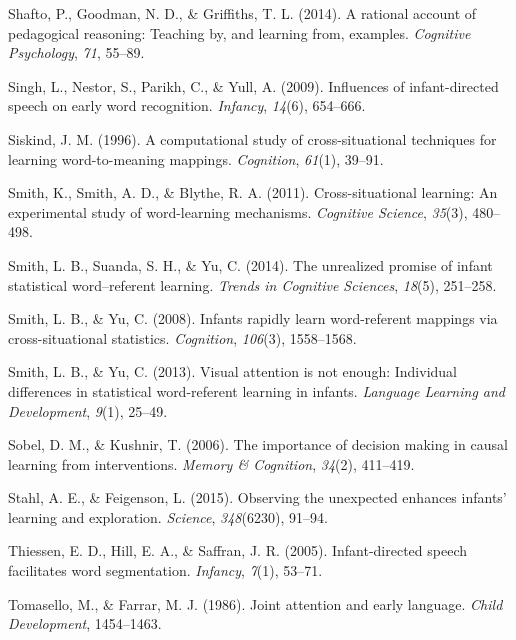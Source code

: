 \documentclass[oneside]{report}
\begin{document}
\leavevmode\hypertarget{ref-shafto2014rational}{}%
Shafto, P., Goodman, N. D., \& Griffiths, T. L. (2014). A rational
account of pedagogical reasoning: Teaching by, and learning from,
examples. \emph{Cognitive Psychology}, \emph{71}, 55--89.

\leavevmode\hypertarget{ref-singh2009influences}{}%
Singh, L., Nestor, S., Parikh, C., \& Yull, A. (2009). Influences of
infant-directed speech on early word recognition. \emph{Infancy},
\emph{14}(6), 654--666.

\leavevmode\hypertarget{ref-siskind1996computational}{}%
Siskind, J. M. (1996). A computational study of cross-situational
techniques for learning word-to-meaning mappings. \emph{Cognition},
\emph{61}(1), 39--91.

\leavevmode\hypertarget{ref-smith2011cross}{}%
Smith, K., Smith, A. D., \& Blythe, R. A. (2011). Cross-situational
learning: An experimental study of word-learning mechanisms.
\emph{Cognitive Science}, \emph{35}(3), 480--498.

\leavevmode\hypertarget{ref-smith2014unrealized}{}%
Smith, L. B., Suanda, S. H., \& Yu, C. (2014). The unrealized promise of
infant statistical word--referent learning. \emph{Trends in Cognitive
Sciences}, \emph{18}(5), 251--258.

\leavevmode\hypertarget{ref-smith2008infants}{}%
Smith, L. B., \& Yu, C. (2008). Infants rapidly learn word-referent
mappings via cross-situational statistics. \emph{Cognition},
\emph{106}(3), 1558--1568.

\leavevmode\hypertarget{ref-smith2013visual}{}%
Smith, L. B., \& Yu, C. (2013). Visual attention is not enough:
Individual differences in statistical word-referent learning in infants.
\emph{Language Learning and Development}, \emph{9}(1), 25--49.

\leavevmode\hypertarget{ref-sobel2006importance}{}%
Sobel, D. M., \& Kushnir, T. (2006). The importance of decision making
in causal learning from interventions. \emph{Memory \& Cognition},
\emph{34}(2), 411--419.

\leavevmode\hypertarget{ref-stahl2015observing}{}%
Stahl, A. E., \& Feigenson, L. (2015). Observing the unexpected enhances
infants' learning and exploration. \emph{Science}, \emph{348}(6230),
91--94.

\leavevmode\hypertarget{ref-thiessen2005infant}{}%
Thiessen, E. D., Hill, E. A., \& Saffran, J. R. (2005). Infant-directed
speech facilitates word segmentation. \emph{Infancy}, \emph{7}(1),
53--71.

\leavevmode\hypertarget{ref-tomasello1986joint}{}%
Tomasello, M., \& Farrar, M. J. (1986). Joint attention and early
language. \emph{Child Development}, 1454--1463.
\end{document}
